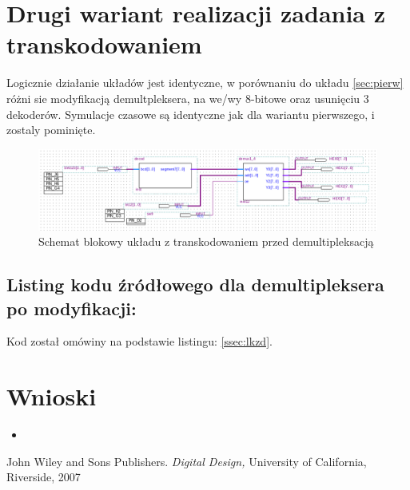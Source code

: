\documentclass{classrep}
\begin{document}
\section{Drugi wariant realizacji zadania z transkodowaniem}
Logicznie działanie układów jest identyczne, w porównaniu do układu \ref{sec:pierw} różni sie modyfikacją demultpleksera, na we/wy 8-bitowe oraz usunięciu 3 dekoderów. Symulacje czasowe są identyczne jak dla wariantu pierwszego, i zostaly pominięte.
\begin{figure}[H]
\centering
\includegraphics[width=1.0\linewidth]{block_segment_bcd}
\caption{Schemat blokowy układu z transkodowaniem przed demultipleksacją}
\label{fig:block_segment_bcd}
\end{figure}

\subsection{Listing kodu źródłowego dla demultipleksera po modyfikacji:}
Kod został omówiny na podstawie listingu: \ref{ssec:lkzd}.



\section{Wnioski}
\begin{itemize}
	\item 
\end{itemize}

\begin{thebibliography}{0}
   John Wiley and Sons Publishers.
    \textsl{Digital Design,} University of California, Riverside, 2007
\end{thebibliography}
\end{document}
